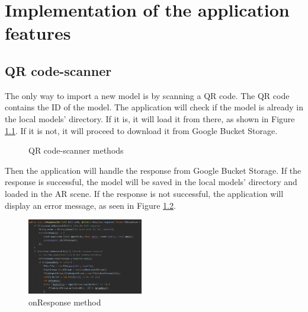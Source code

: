 \chapter{Implementation of the application features}\label{cap:aplicationfeatures}

\section{QR code-scanner}
The only way to import a new model is by scanning a QR code. The QR code contains the ID of the model. The application will check if the model is already in the local models' directory. If it is, it will load it from there, as shown in Figure \ref{fig:loadModelQR}. If it is not, it will proceed to download it from Google Bucket Storage.

\begin{figure}
    \centering
    \vspace{0.3cm}
    \caption{QR code-scanner methods}
    \label{fig:loadModelQR}
\end{figure}



Then the application will handle the response from Google Bucket Storage. If the response is successful, the model will be saved in the local models' directory and loaded in the \ac{AR} scene. If the response is not successful, the application will display an error message, as seen in Figure \ref{fig:onResponse}.


\begin{figure}
    \centering
    \includegraphics[width=0.45\textwidth]{img/code/onResponse.png}
    \caption{onResponse method}
    \label{fig:onResponse}
\end{figure}

